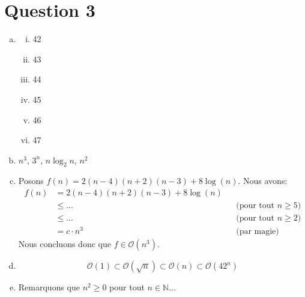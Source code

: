 \documentclass{article}
\newcommand{\N}{\mathbb{N}}
\renewcommand{\O}{\mathcal{O}}
\begin{document}
\section*{Question 3}

\begin{enumerate}[(a)]

\item

  \begin{multicols}{2}
    \begin{enumerate}[(i)]
    \item 42
    \item 43
    \item 44
    \item 45
    \item 46
    \item 47        
    \end{enumerate}
  \end{multicols} 

\item $n^3$, $3^n$, $n \log_2 n$, $n^2$

\item Posons $f(n) = 2(n - 4)(n + 2)(n - 3) + 8 \log(n)$. Nous avons:
  \begin{align*}
    f(n)
    &= 2(n - 4)(n + 2)(n - 3) + 8 \log(n) \\
    &\leq ... && \text{(pour tout $n \geq 5$)}  \\
    &\leq ... && \text{(pour tout $n \geq 2$)}  \\
    &= c \cdot n^3 && \text{(par magie)}
  \end{align*}
  Nous concluons donc que $f \in \O(n^3)$.

\item 

  \[ \O(1) \subset \O(\sqrt{n}) \subset \O(n) \subset \O(42^n) \]

\item Remarquons que $n^2 \geq 0$ pour tout $n \in \N$...

\end{enumerate}
\end{document}
